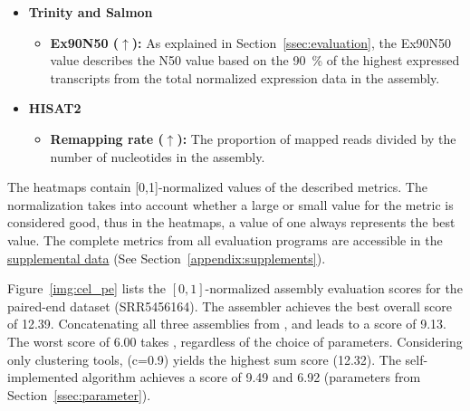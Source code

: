 \documentclass[12pt,a4paper,english]{article}
\begin{document}
\begin{itemize}
			\item \textbf{Trinity and Salmon} \citep{Trinity:11, salmon:17}

				\begin{itemize}
					\item \textbf{Ex90N50 ($\uparrow$):}
					As explained in Section~\ref{ssec:evaluation}, the Ex90N50 value describes the N50 value based on the 90~\% of the highest expressed transcripts  from the total normalized expression data in the assembly.
				\end{itemize}

			\item \textbf{HISAT2} \citep{hisat2:15}
				\begin{itemize}
					\item \textbf{Remapping rate ($\uparrow$):} The proportion of mapped reads divided by the number of nucleotides in the assembly.
				\end{itemize}
		
		\end{itemize}
	
	
	The heatmaps contain [0,1]-normalized values of the described metrics. The normalization takes into account whether a large or small value for the metric is considered good, thus in the heatmaps, a value of one always represents the best value.
	The complete metrics from all evaluation programs are accessible in the \href{https://github.com/lmfaber/master_thesis/tree/master/supplemental_data/assembly_eval}{supplemental data} (See Section~\ref{appendix:supplements}).

		
	

	\newpage
    Figure~\ref{img:cel_pe} lists the $[0,1]$-normalized assembly evaluation scores for the paired-end \celegans dataset (SRR5456164). The assembler \spades achieves the best overall score of 12.39. Concatenating all three assemblies from \spades, \soap and \trinity leads to a score of 9.13. The worst score of 6.00 takes \grouper, regardless of the choice of parameters. Considering only clustering tools, \cdhit (c=0.9) yields the highest sum score (12.32). The self-implemented algorithm \karma achieves a score of 9.49 and 6.92 (parameters from Section~\ref{ssec:parameter}).\\
	
\end{document}

